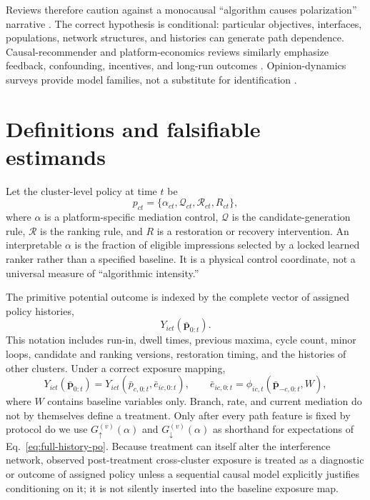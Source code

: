 \documentclass[10pt,a4paper]{article}
\begin{document}
Reviews therefore caution against a monocausal ``algorithm causes polarization'' narrative \cite{kubin2021review,vanbavel2021shapes,hartmann2025review,mahmoudi2024review}. The correct hypothesis is conditional: particular objectives, interfaces, populations, network structures, and histories can generate path dependence. Causal-recommender and platform-economics reviews similarly emphasize feedback, confounding, incentives, and long-run outcomes \cite{gao2024causal,ge2024trustworthy,aridor2024economics}. Opinion-dynamics surveys provide model families, not a substitute for identification \cite{noorazar2020survey}.

\section{Definitions and falsifiable estimands}

Let the cluster-level policy at time $t$ be
\begin{equation}
p_{ct}=\{\alpha_{ct},\mathcal Q_{ct},\mathcal R_{ct},R_{ct}\},
\end{equation}
where $\alpha$ is a platform-specific mediation control, $\mathcal Q$ is the candidate-generation rule, $\mathcal R$ is the ranking rule, and $R$ is a restoration or recovery intervention. An interpretable $\alpha$ is the fraction of eligible impressions selected by a locked learned ranker rather than a specified baseline. It is a physical control coordinate, not a universal measure of ``algorithmic intensity.''

The primitive potential outcome is indexed by the complete vector of assigned policy histories,
\begin{equation}
Y_{ict}\!\left(\bm{\bar p}_{0:t}\right).
\label{eq:full-history-po}
\end{equation}
This notation includes run-in, dwell times, previous maxima, cycle count, minor loops, candidate and ranking versions, restoration timing, and the histories of other clusters. Under a correct exposure mapping,
\begin{equation}
Y_{ict}\!\left(\bm{\bar p}_{0:t}\right)
=Y_{ict}\!\left(\bar p_{c,0:t},\bar e_{ic,0:t}\right),
\qquad
\bar e_{ic,0:t}=\phi_{ic,t}\!\left(\bm{\bar p}_{-c,0:t},W\right),
\label{eq:exposure-map}
\end{equation}
where $W$ contains baseline variables only. Branch, rate, and current mediation do not by themselves define a treatment. Only after every path feature is fixed by protocol do we use $G_{\uparrow}^{(v)}(\alpha)$ and $G_{\downarrow}^{(v)}(\alpha)$ as shorthand for expectations of Eq.~\eqref{eq:full-history-po}. Because treatment can itself alter the interference network, observed post-treatment cross-cluster exposure is treated as a diagnostic or outcome of assigned policy unless a sequential causal model explicitly justifies conditioning on it; it is not silently inserted into the baseline exposure map.
\end{document}
